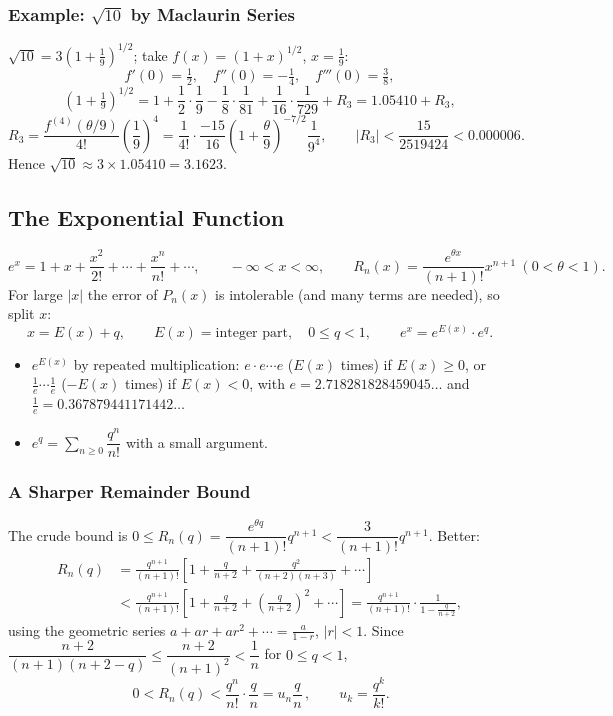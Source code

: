 \documentclass[hidelinks]{article}
\newcommand{\abs}[1]{\left|#1\right|}
\begin{document}
\subsubsection{Example: $\sqrt{10}$ by Maclaurin Series}

$\sqrt{10}=3\left(1+\tfrac19\right)^{1/2}$; take $f(x)=(1+x)^{1/2}$, $x=\tfrac19$:
\[
f'(0)=\tfrac12,\quad f''(0)=-\tfrac14,\quad f'''(0)=\tfrac38,
\]
\[
\left(1+\tfrac19\right)^{1/2}=1+\frac12\cdot\frac19-\frac18\cdot\frac1{81}+\frac1{16}\cdot\frac1{729}+R_3=1.05410+R_3,
\]
\[
R_3=\frac{f^{(4)}(\theta/9)}{4!}\left(\frac19\right)^4=\frac{1}{4!}\cdot\frac{-15}{16}\left(1+\frac\theta9\right)^{-7/2}\frac1{9^4},\qquad \abs{R_3}<\frac{15}{2519424}<0.000006 .
\]
Hence $\sqrt{10}\approx3\times1.05410=3.1623$.

\subsection{The Exponential Function}

\[
e^x=1+x+\frac{x^2}{2!}+\cdots+\frac{x^n}{n!}+\cdots,\qquad -\infty<x<\infty,
\qquad R_n(x)=\frac{e^{\theta x}}{(n+1)!}x^{n+1}\ (0<\theta<1).
\]
For large $\abs x$ the error of $P_n(x)$ is intolerable (and many terms are needed), so split $x$:
\[
x=E(x)+q,\qquad E(x)=\text{integer part},\quad 0\le q<1,\qquad e^x=e^{E(x)}\cdot e^{q}.
\]
\begin{itemize}
    \item $e^{E(x)}$ by repeated multiplication: $e\cdot e\cdots e$ ($E(x)$ times) if $E(x)\ge0$, or $\frac1e\cdots\frac1e$ ($-E(x)$ times) if $E(x)<0$, with $e=2.718281828459045\ldots$ and $\frac1e=0.367879441171442\ldots$
    \item $e^q=\sum_{n\ge0}\dfrac{q^n}{n!}$ with a small argument.
\end{itemize}

\subsubsection{A Sharper Remainder Bound}

The crude bound is $0\le R_n(q)=\dfrac{e^{\theta q}}{(n+1)!}q^{n+1}<\dfrac{3}{(n+1)!}q^{n+1}$. Better:
\[
\begin{aligned}
R_n(q)&=\frac{q^{n+1}}{(n+1)!}\left[1+\frac{q}{n+2}+\frac{q^2}{(n+2)(n+3)}+\cdots\right]\\
&<\frac{q^{n+1}}{(n+1)!}\left[1+\frac{q}{n+2}+\left(\frac{q}{n+2}\right)^2+\cdots\right]
=\frac{q^{n+1}}{(n+1)!}\cdot\frac{1}{1-\frac{q}{n+2}} ,
\end{aligned}
\]
using the geometric series $a+ar+ar^2+\cdots=\frac{a}{1-r}$, $\abs r<1$. Since $\dfrac{n+2}{(n+1)(n+2-q)}\le\dfrac{n+2}{(n+1)^2}<\dfrac1n$ for $0\le q<1$,
\[
\boxed{\,0<R_n(q)<\frac{q^n}{n!}\cdot\frac{q}{n}=u_n\frac{q}{n}\,},\qquad u_k=\frac{q^k}{k!}.
\]
\end{document}

